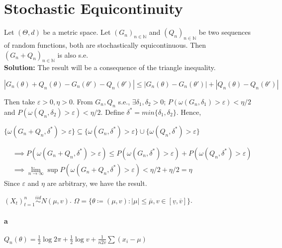 \documentclass[11pt,letterpaper]{article}                  %
\begin{document}
\section{Stochastic Equicontinuity}
\begin{problem}
Let $(\Theta, d)$ be a metric space. Let $(G_n)_{n \in \mathbb{N}}$ and $(Q_n)_{n \in \mathbb{N}}$ be two sequences of random functions, both are stochastically equicontinuous. Then $(G_n + Q_n)_{n \in \mathbb{N}}$ is also s.e.\\

\textbf{Solution:} The result will be a consequence of the triangle inequality.
\begin{center}
$|G_n(\theta)+Q_n(\theta)-G_n(\theta')-Q_n(\theta')|\leq |G_n(\theta)-G_n(\theta')|+|Q_n(\theta)-Q_n(\theta')|$
\end{center}
Then take $\varepsilon>0, \eta>0$. From $G_n, Q_n$ s.e., $\exists \delta_1,\delta_2>0$; $P(\omega(G_n,\delta_1)>\varepsilon)<\eta/2$ and $P(\omega(Q_n,\delta_2)>\varepsilon)<\eta/2$. Define $\delta^*=min\{\delta_1,\delta_2\}$. Hence,
\begin{center}
$\{\omega(G_n+Q_n,\delta^*)>\varepsilon\} \subseteq \{\omega(G_n,\delta^*)>\varepsilon\} \cup \{\omega(Q_n,\delta^*)>\varepsilon\}$
\end{center}
\begin{align*}
&\implies P(\omega(G_n+Q_n,\delta^*)>\varepsilon)\leq P(\omega(G_n,\delta^*)>\varepsilon) + P(\omega(Q_n,\delta^*)>\varepsilon)\\
&\implies \lim_{n\to\infty}\sup P(\omega(G_n+Q_n,\delta^*)>\varepsilon) < \eta/2+\eta/2=\eta
\end{align*}
Since $\varepsilon$ and $\eta$ are arbitrary, we have the result.
\end{problem}

\bigskip
\begin{problem}
\end{problem}

\bigskip
\begin{problem}
$(X_t)_{t=1}^{n} \overset{iid}{\sim} N(\mu, v) $. $\Omega = \{ \theta
\coloneqq (\mu,
v): |\mu| \le \overline{\mu}, v \in [\underline{v}, \overline{v}]\}$.
\paragraph*{a}
$Q_n(\theta) = \tfrac{1}{2}\log 2\pi + \tfrac{1}{2} \log v +
\tfrac{1}{n2v} \sum(x_i - \mu)$
\end{problem}
\end{document}
